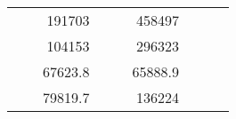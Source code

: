 \begin{table}[H]
\begin{tabular}{|ccrccrccc}
\multicolumn{1}{|c|}{\cellcolor[HTML]{FFFFC7}}                                & \multicolumn{1}{c|}{\cellcolor[HTML]{DDFDFF}}                      & \multicolumn{1}{r|}{\cellcolor[HTML]{DAE8FC}191703}    & \multicolumn{1}{c|}{\cellcolor[HTML]{FFFFC7}}                                & \multicolumn{1}{c|}{\cellcolor[HTML]{DDFDFF}}                       & \multicolumn{1}{r|}{\cellcolor[HTML]{DDFDFF}458497}    &                                                                              &                                                                    &                                                        \\ \cline{3-3} \cline{6-6}
\multicolumn{1}{|c|}{\cellcolor[HTML]{FFFFC7}}                                & \multicolumn{1}{c|}{\cellcolor[HTML]{DDFDFF}}                      & \multicolumn{1}{r|}{\cellcolor[HTML]{DDFDFF}104153}    & \multicolumn{1}{c|}{\cellcolor[HTML]{FFFFC7}}                                & \multicolumn{1}{c|}{\cellcolor[HTML]{DDFDFF}}                       & \multicolumn{1}{r|}{\cellcolor[HTML]{DAE8FC}296323}    &                                                                              &                                                                    &                                                        \\ \cline{3-3} \cline{6-6}
\multicolumn{1}{|c|}{\cellcolor[HTML]{FFFFC7}}                                & \multicolumn{1}{c|}{\cellcolor[HTML]{DDFDFF}}                      & \multicolumn{1}{r|}{\cellcolor[HTML]{DAE8FC}67623.8}   & \multicolumn{1}{c|}{\cellcolor[HTML]{FFFFC7}}                                & \multicolumn{1}{c|}{\cellcolor[HTML]{DDFDFF}}                       & \multicolumn{1}{r|}{\cellcolor[HTML]{DDFDFF}65888.9}   &                                                                              &                                                                    &                                                        \\ \cline{3-3} \cline{6-6}
\multicolumn{1}{|c|}{\cellcolor[HTML]{FFFFC7}}                                & \multicolumn{1}{c|}{\cellcolor[HTML]{DDFDFF}}                      & \multicolumn{1}{r|}{\cellcolor[HTML]{DDFDFF}79819.7}   & \multicolumn{1}{c|}{\cellcolor[HTML]{FFFFC7}}                                & \multicolumn{1}{c|}{\cellcolor[HTML]{DDFDFF}}                       & \multicolumn{1}{r|}{\cellcolor[HTML]{DAE8FC}136224}    &                                                                              &                                                                    &                                                        \\ \cline{3-3} \cline{6-6}

\end{tabular}
\end{table}
